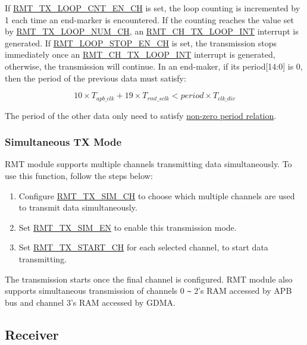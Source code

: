\documentclass[main\_\_EN.tex]{subfiles}
\begin{document}
If \hyperref[fielddesc:RMTTXLOOPCNTENCHN]{RMT\_TX\_LOOP\_CNT\_EN\_CH} is set, the loop counting is incremented by 1 each time an end-marker is encountered. If the counting reaches the value set by \hyperref[fielddesc:RMTTXLOOPNUMCHN]{RMT\_TX\_LOOP\_NUM\_CH}, an \hyperref[int:RMTCHNTXLOOPINT]{RMT\_CH\_TX\_LOOP\_INT} interrupt is generated. If \hyperref[fielddesc:RMTLOOPSTOPENCHN]{RMT\_LOOP\_STOP\_EN\_CH} is set, the transmission stops immediately once an \hyperref[int:RMTCHNTXLOOPINT]{RMT\_CH\_TX\_LOOP\_INT} interrupt is generated, otherwise, the transmission will continue. In an end-maker, if its period[14:0] is 0, then the period of the previous data must satisfy:

\begin{equation}
10 \times T_{apb\_clk} + 19 \times T_{rmt\_sclk} < period \times T_{clk\_div}
\end{equation}

The period of the other data only need to satisfy \hyperref[eq:rmt-period-value]{non-zero period relation}.

\subsubsection{Simultaneous TX Mode}

RMT module supports multiple channels transmitting data simultaneously. To use this function, follow the steps below:

\begin{enumerate}
    \item Configure \hyperref[fielddesc:RMTTXSIMCHN]{RMT\_TX\_SIM\_CH} to choose which multiple channels are used to transmit data simultaneously.
    \item Set \hyperref[fielddesc:RMTTXSIMEN]{RMT\_TX\_SIM\_EN} to enable this transmission mode.
    \item Set \hyperref[fielddesc:RMTTXSTARTCHN]{RMT\_TX\_START\_CH} for each selected channel, to start data transmitting.
\end{enumerate}

The transmission starts once the final channel is configured. RMT module also supports simultaneous transmission of channels 0 \verb+~+ 2's RAM accessed by APB bus and channel 3's RAM accessed by GDMA.


\subsection{Receiver}
\end{document}
